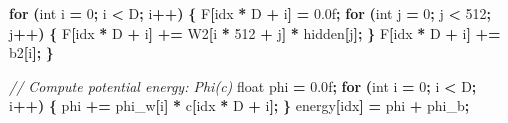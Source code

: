 \documentclass[
  11pt,
  a4paper,
]{article}
\newenvironment{Shaded}{\begin{snugshade}}{\end{snugshade}}
\newcommand{\BuiltInTok}[1]{#1}
\newcommand{\CommentTok}[1]{\textcolor[rgb]{0.56,0.35,0.01}{\textit{#1}}}
\newcommand{\ControlFlowTok}[1]{\textcolor[rgb]{0.13,0.29,0.53}{\textbf{#1}}}
\newcommand{\DataTypeTok}[1]{\textcolor[rgb]{0.13,0.29,0.53}{#1}}
\newcommand{\DecValTok}[1]{\textcolor[rgb]{0.00,0.00,0.81}{#1}}
\newcommand{\FloatTok}[1]{\textcolor[rgb]{0.00,0.00,0.81}{#1}}
\newcommand{\NormalTok}[1]{#1}
\newcommand{\OperatorTok}[1]{\textcolor[rgb]{0.81,0.36,0.00}{\textbf{#1}}}
\begin{document}
\begin{Shaded}
\begin{Highlighting}[]
    \ControlFlowTok{for} \OperatorTok{(}\DataTypeTok{int}\NormalTok{ i }\OperatorTok{=} \DecValTok{0}\OperatorTok{;}\NormalTok{ i }\OperatorTok{\textless{}}\NormalTok{ D}\OperatorTok{;}\NormalTok{ i}\OperatorTok{++)} \OperatorTok{\{}
\NormalTok{        F}\OperatorTok{[}\NormalTok{idx }\OperatorTok{*}\NormalTok{ D }\OperatorTok{+}\NormalTok{ i}\OperatorTok{]} \OperatorTok{=} \FloatTok{0.0}\BuiltInTok{f}\OperatorTok{;}
        \ControlFlowTok{for} \OperatorTok{(}\DataTypeTok{int}\NormalTok{ j }\OperatorTok{=} \DecValTok{0}\OperatorTok{;}\NormalTok{ j }\OperatorTok{\textless{}} \DecValTok{512}\OperatorTok{;}\NormalTok{ j}\OperatorTok{++)} \OperatorTok{\{}
\NormalTok{            F}\OperatorTok{[}\NormalTok{idx }\OperatorTok{*}\NormalTok{ D }\OperatorTok{+}\NormalTok{ i}\OperatorTok{]} \OperatorTok{+=}\NormalTok{ W2}\OperatorTok{[}\NormalTok{i }\OperatorTok{*} \DecValTok{512} \OperatorTok{+}\NormalTok{ j}\OperatorTok{]} \OperatorTok{*}\NormalTok{ hidden}\OperatorTok{[}\NormalTok{j}\OperatorTok{];}
        \OperatorTok{\}}
\NormalTok{        F}\OperatorTok{[}\NormalTok{idx }\OperatorTok{*}\NormalTok{ D }\OperatorTok{+}\NormalTok{ i}\OperatorTok{]} \OperatorTok{+=}\NormalTok{ b2}\OperatorTok{[}\NormalTok{i}\OperatorTok{];}
    \OperatorTok{\}}
    
    \CommentTok{// Compute potential energy: Phi(c)}
    \DataTypeTok{float}\NormalTok{ phi }\OperatorTok{=} \FloatTok{0.0}\BuiltInTok{f}\OperatorTok{;}
    \ControlFlowTok{for} \OperatorTok{(}\DataTypeTok{int}\NormalTok{ i }\OperatorTok{=} \DecValTok{0}\OperatorTok{;}\NormalTok{ i }\OperatorTok{\textless{}}\NormalTok{ D}\OperatorTok{;}\NormalTok{ i}\OperatorTok{++)} \OperatorTok{\{}
\NormalTok{        phi }\OperatorTok{+=}\NormalTok{ phi\_w}\OperatorTok{[}\NormalTok{i}\OperatorTok{]} \OperatorTok{*}\NormalTok{ c}\OperatorTok{[}\NormalTok{idx }\OperatorTok{*}\NormalTok{ D }\OperatorTok{+}\NormalTok{ i}\OperatorTok{];}
    \OperatorTok{\}}
\NormalTok{    energy}\OperatorTok{[}\NormalTok{idx}\OperatorTok{]} \OperatorTok{=}\NormalTok{ phi }\OperatorTok{+}\NormalTok{ phi\_b}\OperatorTok{;}
    

\end{Highlighting}
\end{Shaded}
\end{document}
